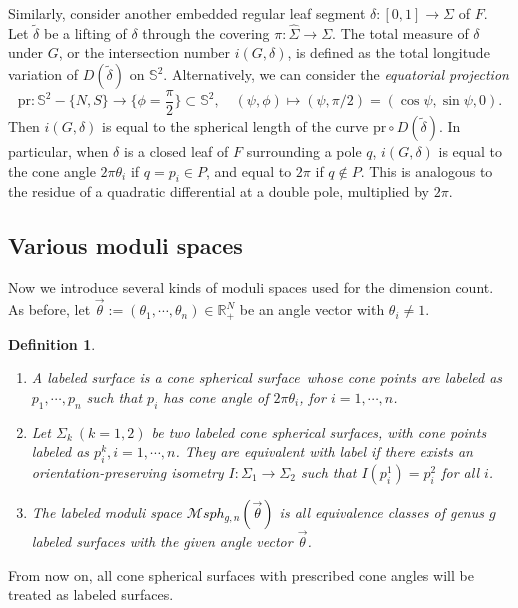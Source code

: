 \documentclass[pdflatex,sn-mathphys]{sn-jnl}%
\numberwithin{equation}{section}
\theoremstyle{thmstyleone}%
\newtheorem{definition}[theorem]{Definition}
\newcommand{\RR}{\mathbb{R}}
\newcommand{\STwo}{\mathbb{S}^2}
\newcommand{\Msphgn}{\mathcal{M}sph_{g,n}(\vec{\theta})}
\newcommand{\csphsf}{cone spherical surface}
\newcommand{\SYM}{\textcolor{black}}
\newcommand{\DEF}{\emph}
\begin{document}
Similarly, consider another embedded regular leaf segment $\delta:[0,1]\to\Sigma$ of $F$. %
Let $\tilde{\delta}$ be a lifting of $\delta$ through the covering $\pi:\hat{\Sigma}\to\Sigma$. 
The total measure of $\delta$ under $G$, or the intersection number $i(G,\delta)$, is defined as the total longitude variation of $D({\tilde{\delta}})$ on $\STwo$. %
Alternatively, we can consider the \DEF{equatorial projection}
    $$ \mathrm{pr}:\STwo-\{N,S\} \longrightarrow \{\phi=\frac\pi2\}\subset\STwo,\quad (\psi,\phi) \mapsto (\psi,\pi/2)=(\cos\psi, \sin\psi, 0). $$
Then $i(G,\delta)$ is equal to the spherical length of the curve $\mathrm{pr}\circ D(\tilde{\delta})$. In particular, when $\delta$ is a closed leaf of $F$ surrounding a pole $q$, $i(G,\delta)$ is equal to the cone angle $2\pi\theta_i$ if $q=p_i\in P$, and equal to $2\pi$ if $q\notin P$. This is analogous to the residue of a quadratic differential at a double pole, multiplied by $2\pi$.

\subsection{Various moduli spaces}\label{sec:moduli_spaces}
Now we introduce several kinds of moduli spaces used for the dimension count. As before, let $\vec{\theta}:=(\theta_1, \cdots, \theta_n) \in \RR_+^N$ be an angle vector with $\theta_i\neq 1$. %
\begin{definition}\label{def:labeled} ~ \begin{enumerate}
    \item A \DEF{labeled surface} is a \csphsf\ whose cone points are labeled as $p_1,\cdots,p_n$ such that $p_i$ has cone angle of $2\pi \theta_i$, for $i=1,\cdots,n$.
    \item Let $\Sigma_k\ (k=1,2)$ be two labeled \csphsf s, with cone points labeled as $p^k_i, i=1,\cdots,n$. They are \DEF{equivalent with label} if there exists an orientation-preserving isometry $I:\Sigma_1 \to \Sigma_2$ such that $I(p^1_i)=p^2_i$ for all $i$.
    \item The \DEF{labeled moduli space} \SYM{$\Msphgn$} is all equivalence classes of genus $g$ labeled surfaces with the given angle vector $\vec{\theta}$.
    \end{enumerate}
\end{definition}
From now on, all \csphsf s with prescribed cone angles will be treated as labeled surfaces.
\end{document}
